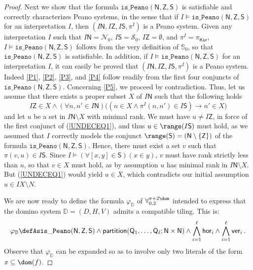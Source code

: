 \documentclass[submission,copyright,creativecommons]{eptcs}
\newcommand{\pairf}[1]{\pi^{#1}}
\newcommand{\inter}{I}
\newcommand{\ipairf}{\pairf{\inter}}
\newcommand{\Langdom}{\ensuremath{\mathbf{\forall}^{\pi +2 \dom}_{0,2}}\xspace}
\newcommand{\dominoSys}{\mathbb{D}}
\newcommand{\peanSys}{\mathbb{S}}
\newcommand{\peanN}{\mathcal{N}}
\newcommand{\peanS}{\mathcal{S}}
\newcommand{\isPeanoSys}{\mathtt{is\_Peano}}
\newcommand{\isPartition}{\mathsf{partition}}
\newcommand{\mN}{\mathsf{N}}
\newcommand{\mQ}{\mathsf{Q}}
\newcommand{\mS}{\mathsf{S}}
\newcommand{\mZ}{\mathsf{Z}}
\newcommand{\horcom}{\mathsf{hor}}
\newcommand{\vercom}{\mathsf{ver}}
\newcommand{\svx}{x}
\newcommand{\svy}{y}
\newcommand{\mvx}{f}
\newcommand{\sx}{u}
\newcommand{\sy}{v}
\begin{document}
\begin{proof}
Next we show that the formula $\isPeanoSys(\mN,\mZ,\mS)$ is
satisfiable and correctly characterizes Peano systems, in the sense
that if $\inter \models \isPeanoSys(\mN,\mZ,\mS)$ for an interpretation
$\inter$, then $(\inter \mN, \inter \mZ, \inter \mS, \ipairf)$ is a
Peano system.
Given any interpretation $\inter$ such that $\inter \mN=\peanN_{0}$,
$\inter \mS=\peanS_{0}$, $\inter \mZ = \emptyset$, and $\ipairf =
\pi_{\mathsf{Kur}}$, $\inter \models \isPeanoSys(\mN,\mZ,\mS)$ follows
from the very definition of $\peanSys_{0}$, so that
$\isPeanoSys(\mN,\mZ,\mS)$ is satisfiable.
In addition, if $\inter \models \isPeanoSys(\mN,\mZ,\mS)$ for an
interpretation $\inter$, it can easily be proved that $(\inter \mN,
\inter \mZ, \inter \mS, \ipairf)$ is a Peano system.  Indeed \ref{P1},
\ref{P2}, \ref{P3}, and \ref{P4} follow readily from the first four
conjuncts of $\isPeanoSys(\mN,\mZ,\mS)$.  
Concerning \ref{P5}, we proceed by contradiction.
Thus, let us assume that there exists a proper subset $X$ of $\inter
\mN$ such that the following holds
\begin{equation}\label{UNDECEQ1}
 \inter \mZ \in X \wedge (\forall n,n' \in \inter \mN)\big((n \in X
 \wedge \ipairf(n,n') \in \inter \mS) \longrightarrow n' \in X\big)
\end{equation}
and let $\sx$ be a set in $\inter \mN \setminus X$ with minimal rank.
We must have $\sx\neq\inter \mZ$, in force of the first conjunct of
(\ref{UNDECEQ1}), and thus $\sx \in \range(\inter \mS)$ must hold, as
we assumed that $\inter$ correctly models the conjunct $\range(\mS) =
(\mN \setminus \{\mZ\})$ of the formula $\isPeanoSys(\mN,\mZ,\mS)$.
Hence, there must exist a set $\sy$ such that $\pi(\sy, \sx) \in
\inter \mS$.  Since $\inter \models (\forall [\svx, \svy] \in \mS)(\svx
\in \svy)$, $\sy$ must have rank strictly less than $\sx$, so that
$\sy \in X$ must hold, as by assumption $\sx$ has minimal rank in
$\inter \mN \setminus X$.  But (\ref{UNDECEQ1}) would yield $\sx \in X$,
which contradicts our initial assumption $\sx \in \inter X \setminus
N$.



We are now ready to define the formula $\varphi_{\dominoSys}$ of
$\Langdom$ intended to express that the domino system
$\dominoSys=(D,H,V)$ admits a compatible tiling. This is:
\[
 \varphi_{\dominoSys} \defAs \isPeanoSys(\mN,\mZ,\mS) \wedge
 \isPartition(\mQ_1, \ldots, \mQ_\ell; \mN \times \mN) \wedge
 \bigwedge_{i=1}^{\ell} \horcom_i
 \wedge
 \bigwedge_{i=1}^{\ell} \vercom_i\,.
\]
Observe that $\varphi_{\dominoSys}$ can be expanded so as to involve 
only two literals of the form $\svx \subseteq \dom(\mvx)$.


\end{proof}
\end{document}
